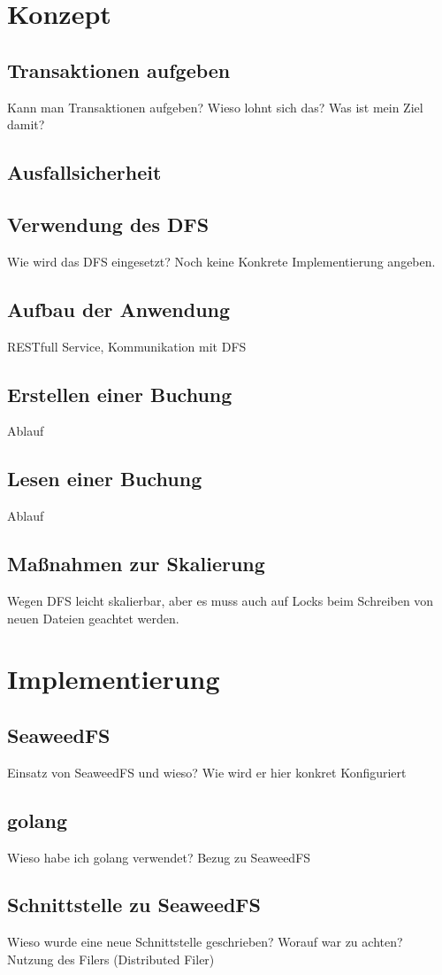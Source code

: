 \documentclass[12pt,oneside,a4paper,parskip]{scrbook}
\begin{document}
\chapter{Konzept}
\section{Transaktionen aufgeben}
Kann man Transaktionen aufgeben? Wieso lohnt sich das? Was ist mein Ziel damit?
\section{Ausfallsicherheit}
\section{Verwendung des DFS}
Wie wird das DFS eingesetzt? Noch keine Konkrete Implementierung angeben.
\section{Aufbau der Anwendung}
RESTfull Service, Kommunikation mit DFS
\section{Erstellen einer Buchung}
Ablauf
\section{Lesen einer Buchung}
Ablauf
\section{Maßnahmen zur Skalierung}
Wegen DFS leicht skalierbar, aber es muss auch auf Locks beim Schreiben von neuen Dateien geachtet werden.


\chapter{Implementierung}
\section{SeaweedFS}
Einsatz von SeaweedFS und wieso?
Wie wird er hier konkret Konfiguriert
\section{golang}
Wieso habe ich golang verwendet? Bezug zu SeaweedFS 
\section{Schnittstelle zu SeaweedFS}
Wieso wurde eine neue Schnittstelle geschrieben?
Worauf war zu achten? Nutzung des Filers (Distributed Filer)
\end{document}

